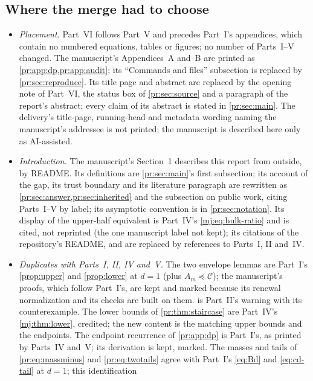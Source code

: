 \documentclass[11pt,a4paper]{article}
\theoremstyle{definition}\newaliascnt{definition}{theorem}
\theoremstyle{remark}\newaliascnt{remark}{theorem}
\newcommand{\Cat}{\mathcal C}
\newcommand{\preceqc}{\preceq}
\begin{document}
\subsection{Where the merge had to choose}
\label{pr:sec:merge}
\begin{itemize}
\item \emph{Placement.} Part~VI follows Part~V and precedes Part~I's
 appendices, which contain no numbered equations, tables or figures; no
 number of Parts~I--V changed. The manuscript's Appendices~A and~B are
 printed as \cref{pr:app:dp,pr:app:audit}; its ``Commands and files''
 subsection is replaced by \cref{pr:sec:reproduce}. Its title page and
 abstract are replaced by the opening note of Part~VI, the status box of
 \cref{pr:sec:source} and a paragraph of the report's abstract; every claim
 of its abstract is stated in \cref{pr:sec:main}. The delivery's title-page,
 running-head and metadata wording naming the manuscript's addressee is not
 printed; the manuscript is described here only as AI-assisted.
\item \emph{Introduction.} The manuscript's Section~1 describes this report
 from outside, by README. Its definitions are \cref{pr:sec:main}'s first
 subsection; its account of the gap, its trust boundary and its literature
 paragraph are rewritten as \cref{pr:sec:answer,pr:sec:inherited} and the
 subsection on public work, citing Parts~I--V by label; its asymptotic
 convention is in \cref{pr:sec:notation}. Its display of the upper-half
 equivalent is Part~IV's \eqref{mj:eq:bulk-ratio} and is cited, not
 reprinted (the one manuscript label not kept); its citations of the
 repository's README,  and
  are replaced by references to
 Parts~I, II and~IV.
\item \emph{Duplicates with Parts~I, II, IV and~V.} The two envelope lemmas
 are Part~I's \cref{prop:upper} and \cref{prop:lower} at $d=1$ (plus
 $\overline A_m\preceqc\Cat$); the manuscript's proofs, which follow Part~I's,
 are kept and marked because its renewal normalization and its checks are
 built on them.  is Part~II's warning with its
 counterexample. The lower bounds of \cref{pr:thm:staircase} are Part~IV's
 \cref{mj:thm:lower}, credited; the new content is the matching upper bounds
 and the endpoints. The endpoint recurrence of \cref{pr:app:dp} is Part~I's,
 as printed by Parts~IV and~V; its derivation is kept, marked. The masses
 and tails of \eqref{pr:eq:massminus} and \eqref{pr:eq:twotails} agree with
 Part~I's \eqref{eq:Bd} and \eqref{eq:cd-tail} at $d=1$; this identification

\end{itemize}
\end{document}
